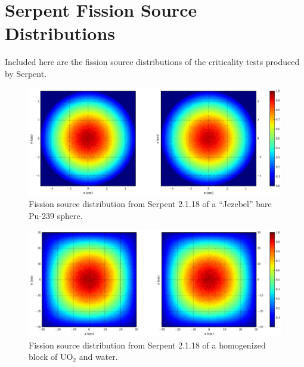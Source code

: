 \section{Serpent Fission Source Distributions}

Included here are the fission source distributions of the criticality tests produced by Serpent.  

\begin{figure}[h!] 
  \centering
    \includegraphics[width=\textwidth,trim= 4cm 0cm 6cm 0cm]{graphics/finalresults/godiva_fiss_serp-6.eps}
     \caption{Fission source distribution from Serpent 2.1.18 of a ``Jezebel'' bare Pu-239 sphere. \label{serp_godiva_mesh} }
\end{figure}

\begin{figure}[h!] 
  \centering
    \includegraphics[width=\textwidth,trim= 4cm 0cm 6cm 0cm]{graphics/finalresults/homfuel_fiss_serp-6.eps}
     \caption{Fission source distribution from Serpent 2.1.18 of a homogenized block of UO$_2$ and water. \label{serp_homfuel_mesh} }
\end{figure}

